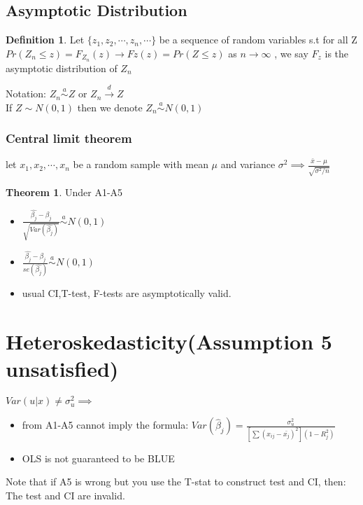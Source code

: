 \documentclass{article}
\theoremstyle{definition}
\newtheorem{definition}{Definition}[section]
\theoremstyle{thrm}
\newtheorem{thrm}{Theorem}[section]
\theoremstyle{lma}
\theoremstyle{ppst}
\theoremstyle{crlr}
\begin{document}
\subsection{Asymptotic Distribution}
\begin{definition}
	Let $\{z_1,z_2,\cdots,z_n,\cdots\}$ be a sequence of random variables s.t for all Z $Pr(Z_n \leq z) = F_{Z_n}(z)\to Fz(z) = Pr(Z\leq z)$ as $n \to \infty$ , we say $F_z$ is the asymptotic distribution of $Z_n$
\end{definition}
Notation: $Z_n \stackrel{a}{\sim} Z$ or $Z_n\stackrel{d}{\to}Z$\\
If $Z\sim N(0,1)$ then we denote $Z_n \stackrel{a}{\sim} N(0,1)$
\subsubsection{Central limit theorem}
let $x_1,x_2,\cdots, x_n$ be a random sample with mean $\mu$ and variance $\sigma^2 \implies \frac{\bar{x}-\mu}{\sqrt{\sigma^2/n}}$
\begin{thrm}
	Under A1-A5\begin{itemize}
		\item $\frac{\hat{\beta_j}-\beta_j}{\sqrt{Var(\hat{\beta_j})}}\stackrel{a}{\sim} N(0,1)$
		\item $\frac{\hat{\beta_j}-\beta_j}{se(\hat{\beta_j})}\stackrel{a}{\sim} N(0,1)$
		\item usual CI,T-test, F-tests are asymptotically valid.
	\end{itemize}
\end{thrm}

\section{Heteroskedasticity(Assumption 5 unsatisfied)}
$Var(u|x) \neq \sigma_u^2 \implies$
\begin{itemize}
	\item from A1-A5 cannot imply the formula: $Var(\hat{\beta}_j) = \frac{\sigma_u^2}{[\sum(x_{ij}-\bar{x_j})^2](1-R_j^2)}$
	\item OLS is not guaranteed to be BLUE
\end{itemize}
Note that if A5 is wrong but you use the T-stat to construct test and CI, then: The test and CI are invalid. 
\end{document}
